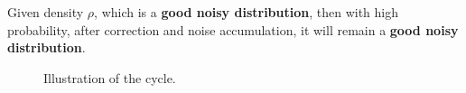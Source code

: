 \documentclass[manuscript,screen,review]{acmart}
\begin{document}
\begin{claim}
Given density $\rho$, which is a \textbf{good noisy distribution}, then with high probability, after correction and noise accumulation, it will remain a \textbf{good noisy distribution}.
\end{claim}

\begin{figure}[h]
  \begin{center}
\end{center}
\caption{Illustration of the cycle.}
\end{figure}
\end{document}
